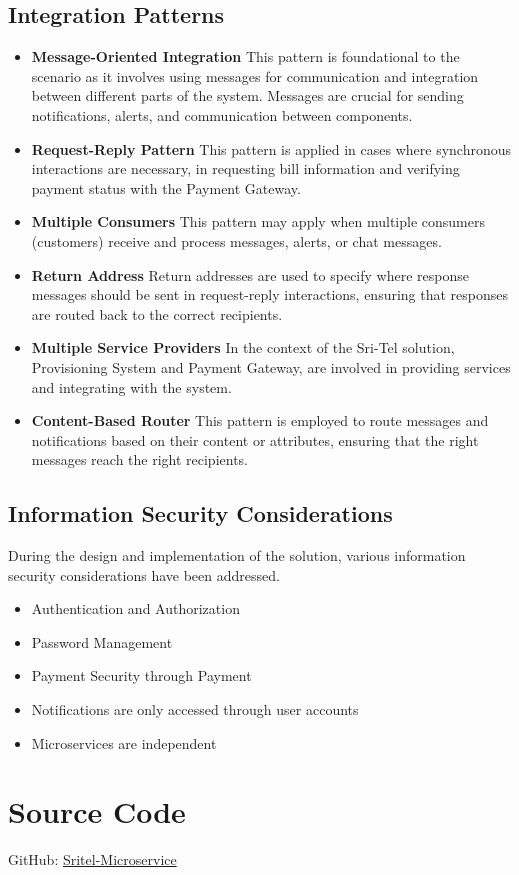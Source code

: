 \documentclass[12pt]{article}
\begin{document}
\subsection{Integration Patterns}
\begin{itemize}
    \item \textbf{Message-Oriented Integration} 
        This pattern is foundational to the scenario as it involves using messages for communication and integration between different parts of the system. Messages are crucial for sending notifications, alerts, and communication between components.
    \item \textbf{Request-Reply Pattern}
        This pattern is applied in cases where synchronous interactions are necessary, in requesting bill information and verifying payment status with the Payment Gateway.
    \item \textbf{Multiple Consumers}
        This pattern may apply when multiple consumers (customers) receive and process messages, alerts, or chat messages.
    \item \textbf{Return Address}
        Return addresses are used to specify where response messages should be sent in request-reply interactions, ensuring that responses are routed back to the correct recipients.
    \item \textbf{Multiple Service Providers}
        In the context of the Sri-Tel solution, Provisioning System and Payment Gateway, are involved in providing services and integrating with the system.
    \item \textbf{Content-Based Router}
        This pattern is employed to route messages and notifications based on their content or attributes, ensuring that the right messages reach the right recipients.
\end{itemize}


\subsection{Information Security Considerations}
During the design and implementation of the solution, various information security considerations have been addressed.
\begin{itemize}
    \item Authentication and Authorization
    \item Password Management
    \item Payment Security through Payment 
    \item Notifications are only accessed through user accounts
    \item Microservices are independent    
\end{itemize}


\section{Source Code}
GitHub: \href{https://github.com/raminduw200/sritel-microservice}{Sritel-Microservice}
\end{document}
